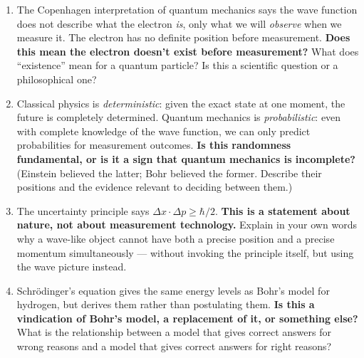 \documentclass[12pt, a4paper]{book}
\begin{document}
\begin{reflectionbox}
\begin{enumerate}[label=\textbf{R\arabic*.}]
  \item The Copenhagen interpretation of quantum mechanics says
        the wave function does not describe what the electron
        \emph{is}, only what we will \emph{observe} when we measure it.
        The electron has no definite position before measurement.
        \textbf{Does this mean the electron doesn't exist before
        measurement?} What does ``existence'' mean for a quantum
        particle? Is this a scientific question or a philosophical one?

  \item Classical physics is \emph{deterministic}: given the
        exact state at one moment, the future is completely
        determined.
        Quantum mechanics is \emph{probabilistic}: even with
        complete knowledge of the wave function, we can only
        predict probabilities for measurement outcomes.
        \textbf{Is this randomness fundamental, or is it a
        sign that quantum mechanics is incomplete?}
        (Einstein believed the latter; Bohr believed the former.
        Describe their positions and the evidence relevant to
        deciding between them.)

  \item The uncertainty principle says $\Delta x \cdot \Delta p \geq \hbar/2$.
        \textbf{This is a statement about nature, not about measurement
        technology.} Explain in your own words why a wave-like object
        cannot have both a precise position and a precise momentum
        simultaneously --- without invoking the principle itself,
        but using the wave picture instead.

  \item Schr\"{o}dinger's equation gives the same energy levels
        as Bohr's model for hydrogen, but derives them rather than
        postulating them.
        \textbf{Is this a vindication of Bohr's model, a replacement
        of it, or something else?}
        What is the relationship between a model that gives correct
        answers for wrong reasons and a model that gives correct
        answers for right reasons?
\end{enumerate}
\end{reflectionbox}
\end{document}
